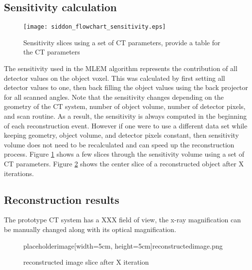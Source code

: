 \subsection{Sensitivity calculation}

\begin{figure}
\centering
\texttt{[image: siddon\_flowchart\_sensitivity.eps]}
\label{fig:sensitivityslices}
\caption{Sensitivity slices using a set of CT parameters, provide a table for the CT parameters}
\end{figure}

The sensitivity used in the MLEM algorithm represents the contribution of all detector values on the object voxel.  This was calculated by first setting all detector values to one, then back filling the object values using the back projector for all scanned angles.  Note that the sensitivity changes depending on the geometry of the CT system, number of object volume, number of detector pixels, and scan routine.  As a result, the sensitivity is always computed in the beginning of each reconstruction event.  However if one were to use a different data set while keeping geometry, object volume, and detector pixels constant, then sensitivity volume does not need to be recalculated and can speed up the reconstruction process.  Figure \ref{fig:sensitivityslices} shows a few slices through the sensitivity volume using a set of CT parameters.
Figure \ref{fig:reconstructedimage} shows the center slice of a reconstructed object after X iterations.

\subsection{Reconstruction results}
The prototype CT system has a XXX field of view, the x-ray magnification can be manually changed along with its optical magnification.  
\begin{figure}
\centering
placeholderimage[width=5cm, height=5cm]{reconstructedimage.png}
\label{fig:reconstructedimage}
\caption{reconstructed image slice after X iteration}
\end{figure}

